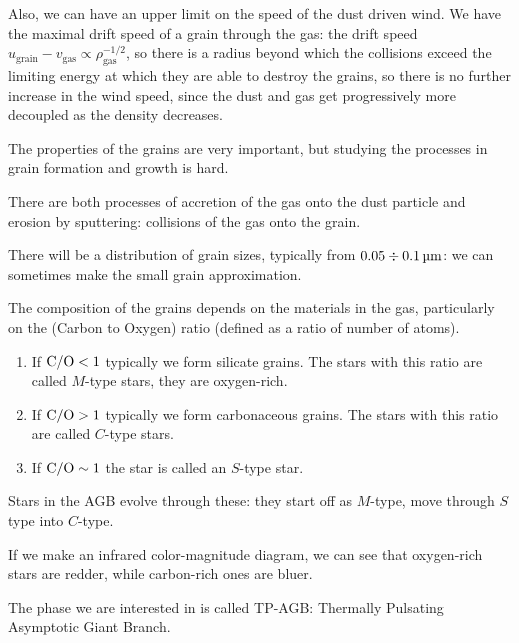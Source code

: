 \documentclass[main.tex]{subfiles}
\begin{document}
Also, we can have an upper limit on the speed of the dust driven wind. We have the maximal drift speed of a grain through the gas: the drift speed \(u_{\text{grain}} - v _{\text{gas}} \propto \rho _{\text{gas}}^{-1/2}\), so there is a radius beyond which the collisions exceed the limiting energy at which they are able to destroy the grains, so there is no further increase in the wind speed, since the dust and gas get progressively more decoupled as the density decreases. 

The properties of the grains are very important, but studying the processes in grain formation and growth is hard. 

There are both processes of accretion of the gas onto the dust particle and erosion by sputtering: collisions of the gas onto the grain. 

There will be a distribution of grain sizes, typically from \(\num{.05} \divisionsymbol \SI{.1}{\micro\metre}\): we can sometimes make the small grain approximation. 

The composition of the grains depends on the materials in the gas, particularly on the  (Carbon to Oxygen) ratio (defined as a ratio of number of atoms).

\begin{enumerate}
  \item If \(\ce{C/O} <1\) typically we form silicate grains. The stars with this ratio are called \(M\)-type stars, they are oxygen-rich.
  \item If \(\ce{C/O} >1\) typically we form carbonaceous grains. The stars with this ratio are called \(C\)-type stars. 
  \item If \(\ce{C/O} \sim 1\) the star is called an \(S\)-type star.
\end{enumerate}

Stars in the AGB evolve through these: they start off as \(M\)-type, move through \(S\) type into \(C\)-type.

If we make an infrared color-magnitude diagram, we can see that oxygen-rich stars are redder, while carbon-rich ones are bluer.

The phase we are interested in is called TP-AGB: Thermally Pulsating Asymptotic Giant Branch.
\end{document}
